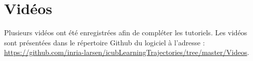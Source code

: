 \documentclass[utf8]{frontiersSCNS} %
\begin{document}
%
%
%
%
%



\section{Vidéos}
\label{sec:video}
%
Plusieurs vidéos ont été enregistrées afin de compléter les tutoriels. Les vidéos sont présentées dans le répertoire Github du logiciel à l'adresse :
\url{https://github.com/inria-larsen/icubLearningTrajectories/tree/master/Videos}.

% 
%
% 
%
%
%
%
\end{document}
